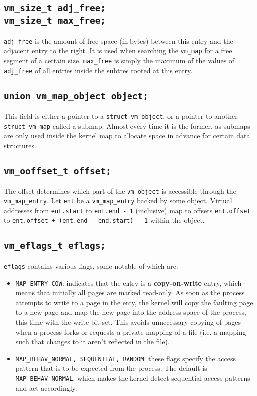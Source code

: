 \documentclass[shortabstract, english]{iithesis}
\begin{document}
\subsection*{\texttt{vm_size_t adj_free;}\\
  \texttt{vm_size_t max_free;}}
\texttt{adj_free} is the amount of free space (in bytes) between this
entry and the adjacent entry to the right. It is used when searching the
\texttt{vm_map} for a free segment of a certain size.
\texttt{max_free} is simply the maximum of the values of
\texttt{adj_free} of all entries inside the subtree rooted at this entry.

\subsection*{\texttt{union vm_map_object object;}}
This field is either a pointer to a \texttt{struct vm_object}, or a
pointer to another \texttt{struct vm_map} called a submap. Almost every
time it is the former, as submaps are only used inside the kernel map to
allocate space in advance for certain data structures.

\subsection*{\texttt{vm_ooffset_t offset;}}
The offset determines which part of the \texttt{vm_object} is accessible
through the \texttt{vm_map_entry}. Let \texttt{ent} be a
\texttt{vm_map_entry} backed by some object. Virtual addresses from
\texttt{ent.start} to \texttt{ent.end - 1} (inclusive) map to
offsets \texttt{ent.offset} to
\texttt{ent.offset + (ent.end - end.start) - 1}
within the object.

\subsection*{\texttt{vm_eflags_t eflags;}}
\texttt{eflags} contains various flags, some notable of which are:
\begin{itemize}
\item \texttt{MAP_ENTRY_COW}: indicates that the entry is a
  \textbf{copy-on-write} entry, which means that initially all pages are marked
  read-only. As soon as the process attempts to write to a page in the enty, the
  kernel will copy the faulting page to a new page and map the new page into the
  address space of the process, this time with the write bit set. This avoids
  unnecessary copying of pages when a process forks or requests a private
  mapping of a file (i.e. a mapping such that changes to it aren't reflected in
  the file).
\item \texttt{MAP_BEHAV_{NORMAL, SEQUENTIAL, RANDOM}}: these flags
  specify the access pattern that is to be expected from the process. The
  default is \texttt{MAP_BEHAV_NORMAL}, which makes the kernel detect
  sequential access patterns and act accordingly.
\end{itemize}
\end{document}
